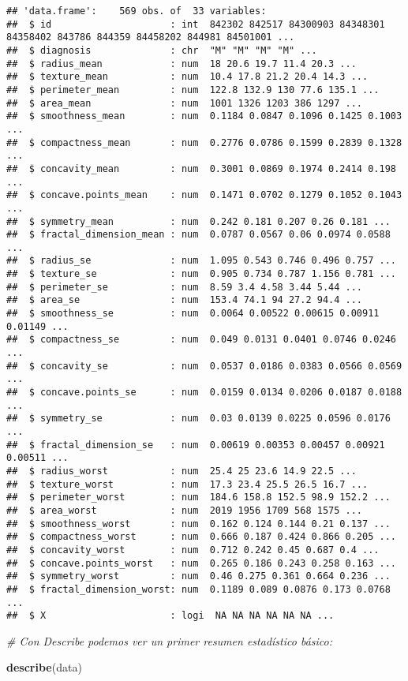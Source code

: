 \documentclass[
]{article}
\newenvironment{Shaded}{\begin{snugshade}}{\end{snugshade}}
\newcommand{\CommentTok}[1]{\textcolor[rgb]{0.56,0.35,0.01}{\textit{#1}}}
\newcommand{\FunctionTok}[1]{\textcolor[rgb]{0.13,0.29,0.53}{\textbf{#1}}}
\newcommand{\NormalTok}[1]{#1}
\begin{document}
\begin{verbatim}
## 'data.frame':    569 obs. of  33 variables:
##  $ id                     : int  842302 842517 84300903 84348301 84358402 843786 844359 84458202 844981 84501001 ...
##  $ diagnosis              : chr  "M" "M" "M" "M" ...
##  $ radius_mean            : num  18 20.6 19.7 11.4 20.3 ...
##  $ texture_mean           : num  10.4 17.8 21.2 20.4 14.3 ...
##  $ perimeter_mean         : num  122.8 132.9 130 77.6 135.1 ...
##  $ area_mean              : num  1001 1326 1203 386 1297 ...
##  $ smoothness_mean        : num  0.1184 0.0847 0.1096 0.1425 0.1003 ...
##  $ compactness_mean       : num  0.2776 0.0786 0.1599 0.2839 0.1328 ...
##  $ concavity_mean         : num  0.3001 0.0869 0.1974 0.2414 0.198 ...
##  $ concave.points_mean    : num  0.1471 0.0702 0.1279 0.1052 0.1043 ...
##  $ symmetry_mean          : num  0.242 0.181 0.207 0.26 0.181 ...
##  $ fractal_dimension_mean : num  0.0787 0.0567 0.06 0.0974 0.0588 ...
##  $ radius_se              : num  1.095 0.543 0.746 0.496 0.757 ...
##  $ texture_se             : num  0.905 0.734 0.787 1.156 0.781 ...
##  $ perimeter_se           : num  8.59 3.4 4.58 3.44 5.44 ...
##  $ area_se                : num  153.4 74.1 94 27.2 94.4 ...
##  $ smoothness_se          : num  0.0064 0.00522 0.00615 0.00911 0.01149 ...
##  $ compactness_se         : num  0.049 0.0131 0.0401 0.0746 0.0246 ...
##  $ concavity_se           : num  0.0537 0.0186 0.0383 0.0566 0.0569 ...
##  $ concave.points_se      : num  0.0159 0.0134 0.0206 0.0187 0.0188 ...
##  $ symmetry_se            : num  0.03 0.0139 0.0225 0.0596 0.0176 ...
##  $ fractal_dimension_se   : num  0.00619 0.00353 0.00457 0.00921 0.00511 ...
##  $ radius_worst           : num  25.4 25 23.6 14.9 22.5 ...
##  $ texture_worst          : num  17.3 23.4 25.5 26.5 16.7 ...
##  $ perimeter_worst        : num  184.6 158.8 152.5 98.9 152.2 ...
##  $ area_worst             : num  2019 1956 1709 568 1575 ...
##  $ smoothness_worst       : num  0.162 0.124 0.144 0.21 0.137 ...
##  $ compactness_worst      : num  0.666 0.187 0.424 0.866 0.205 ...
##  $ concavity_worst        : num  0.712 0.242 0.45 0.687 0.4 ...
##  $ concave.points_worst   : num  0.265 0.186 0.243 0.258 0.163 ...
##  $ symmetry_worst         : num  0.46 0.275 0.361 0.664 0.236 ...
##  $ fractal_dimension_worst: num  0.1189 0.089 0.0876 0.173 0.0768 ...
##  $ X                      : logi  NA NA NA NA NA NA ...
\end{verbatim}

\begin{Shaded}
\begin{Highlighting}[]
\CommentTok{\# Con Describe podemos ver un primer resumen estadístico básico:}

\FunctionTok{describe}\NormalTok{(data)}
\end{Highlighting}
\end{Shaded}
\end{document}
